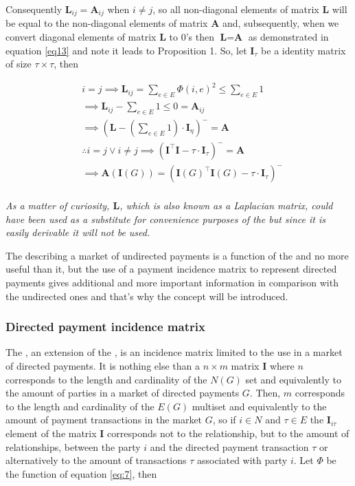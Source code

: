 \documentclass[12pt]{article}
\begin{document}
\begin{multicols}{2}
Consequently $\textbf{L}_{ij} = \textbf{A}_{ij}$ when $i \neq j$, so all non-diagonal elements of matrix $\textbf{L}$ will be equal to the non-diagonal elements of matrix $\textbf{A}$ and, subsequently, when we convert diagonal elements of matrix $\textbf{L}$ to $0$'s then  $\textbf{L} = \textbf{A}$ as demonstrated in equation \ref{eq13} and note it leads to Proposition 1. So, let $\textbf{I}_{\tau}$ be a identity matrix of size $\tau \times \tau$, then

\begin{equation} \label{eq13}
    \begin{split}
        & i = j \implies \textbf{L}_{ij} = \sum_{e \in E} \Phi(i, e)^2 \leq \sum_{e \in E} 1\\
        & \implies \textbf{L}_{ij} - \sum_{e \in E} 1 \leq 0 = \textbf{A}_{ij} \\
        & \implies (\textbf{L} - (\sum_{e \in  E} 1) \cdot \textbf{I}_{\eta})^{-} = \textbf{A}\\
        & \therefore i = j \lor i \neq j \implies (\textbf{I}^{\top}\textbf{I} - \tau \cdot \textbf{I}_{\tau})^{-} = \textbf{A} \\
        & \implies \textbf{A}(\textbf{I}(G)) = (\textbf{I}(G)^{\top}\textbf{I}(G) - \tau \cdot \textbf{I}_{\tau})^{-} \\
    \end{split}
\end{equation}

\emph{As a matter of curiosity, $\textbf{L}$, which is also known as a Laplacian matrix, could have been used as a substitute for convenience purposes of the  but since it is easily derivable it will not be used.}

The  describing a market of undirected payments is a function of the  and no more useful than it, but the use of a payment incidence matrix to represent directed payments gives additional and more important information in comparison with the undirected ones and that's why the  concept will be introduced.

\subsubsection{Directed payment incidence matrix} \label{dpim}

The , an extension of the , is an incidence matrix limited to the use in a market of directed payments. It is nothing else than a $n \times m$ matrix $\textbf{I}$ where $n$ corresponds to the length and cardinality of the $N(G)$ set and equivalently to the amount of parties in a market of directed payments $G$. Then, $m$ corresponds to the length and cardinality of the $E(G)$ multiset and equivalently to the amount of payment transactions in the market $G$, so if $i \in N$ and $\tau \in E$ the $\textbf{I}_{i\tau}$ element of the matrix $\textbf{I}$ corresponds not to the relationship, but to the amount of relationships, between the party $i$ and the directed payment transaction $\tau$ or alternatively to the amount of transactions $\tau$ associated with party $i$. Let $\Phi$ be the function of equation \ref{eq:7}, then


\end{multicols}
\end{document}
